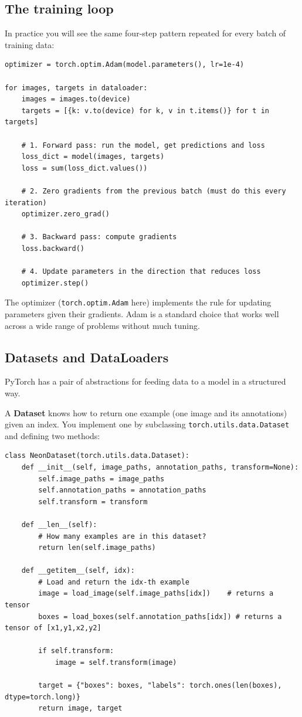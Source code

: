 \documentclass[11pt, a4paper]{article}
\begin{document}
\subsection{The training loop}

In practice you will see the same four-step pattern repeated for every batch
of training data:

\begin{lstlisting}
optimizer = torch.optim.Adam(model.parameters(), lr=1e-4)

for images, targets in dataloader:
    images = images.to(device)
    targets = [{k: v.to(device) for k, v in t.items()} for t in targets]

    # 1. Forward pass: run the model, get predictions and loss
    loss_dict = model(images, targets)
    loss = sum(loss_dict.values())

    # 2. Zero gradients from the previous batch (must do this every iteration)
    optimizer.zero_grad()

    # 3. Backward pass: compute gradients
    loss.backward()

    # 4. Update parameters in the direction that reduces loss
    optimizer.step()
\end{lstlisting}

The optimizer (\lstinline{torch.optim.Adam} here) implements the rule for
updating parameters given their gradients. Adam is a standard choice that
works well across a wide range of problems without much tuning.

\subsection{Datasets and DataLoaders}

PyTorch has a pair of abstractions for feeding data to a model in a structured
way.

A \textbf{Dataset} knows how to return one example (one image and its
annotations) given an index. You implement one by subclassing
\lstinline{torch.utils.data.Dataset} and defining two methods:

\begin{lstlisting}
class NeonDataset(torch.utils.data.Dataset):
    def __init__(self, image_paths, annotation_paths, transform=None):
        self.image_paths = image_paths
        self.annotation_paths = annotation_paths
        self.transform = transform

    def __len__(self):
        # How many examples are in this dataset?
        return len(self.image_paths)

    def __getitem__(self, idx):
        # Load and return the idx-th example
        image = load_image(self.image_paths[idx])    # returns a tensor
        boxes = load_boxes(self.annotation_paths[idx]) # returns a tensor of [x1,y1,x2,y2]

        if self.transform:
            image = self.transform(image)

        target = {"boxes": boxes, "labels": torch.ones(len(boxes), dtype=torch.long)}
        return image, target
\end{lstlisting}
\end{document}
